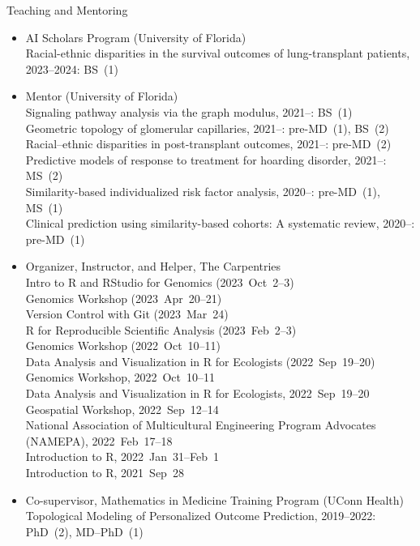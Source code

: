 \documentclass[10pt,a4paper]{article}
\begin{document}
\vspace{.25cm}
{\sc Teaching and Mentoring}
\begin{itemize}[label=$\circ$,nolistsep]
\item
AI Scholars Program (University of Florida) \\
Racial-ethnic disparities in the survival outcomes of lung-transplant patients, 2023--2024: BS~(1)
\item
Mentor (University of Florida) \\
Signaling pathway analysis via the graph modulus, 2021--: BS~(1) \\
Geometric topology of glomerular capillaries, 2021--: pre-MD~(1), BS~(2) \\
Racial--ethnic disparities in post-transplant outcomes, 2021--: pre-MD~(2) \\
Predictive models of response to treatment for hoarding disorder, 2021--: MS~(2) \\
Similarity-based individualized risk factor analysis, 2020--: pre-MD~(1), MS~(1) \\
Clinical prediction using similarity-based cohorts: A systematic review, 2020--: pre-MD~(1)
\item
Organizer, Instructor, and Helper, The Carpentries \\
Intro to R and RStudio for Genomics (2023~Oct~2--3) \\
Genomics Workshop (2023~Apr~20--21) \\
Version Control with Git (2023~Mar~24) \\
R for Reproducible Scientific Analysis (2023~Feb~2--3) \\
Genomics Workshop (2022~Oct~10--11) \\
Data Analysis and Visualization in R for Ecologists (2022~Sep~19--20) \\
Genomics Workshop, 2022~Oct~10--11 \\
Data Analysis and Visualization in R for Ecologists, 2022~Sep~19--20 \\
Geospatial Workshop, 2022~Sep~12--14 \\
National Association of Multicultural Engineering Program Advocates (NAMEPA), 2022~Feb~17--18 \\
Introduction to R, 2022~Jan~31--Feb~1 \\
Introduction to R, 2021~Sep~28
\item
Co-supervisor, Mathematics in Medicine Training Program (UConn Health) \\
Topological Modeling of Personalized Outcome Prediction, 2019--2022: PhD~(2), MD--PhD~(1)

\end{itemize}
\end{document}
